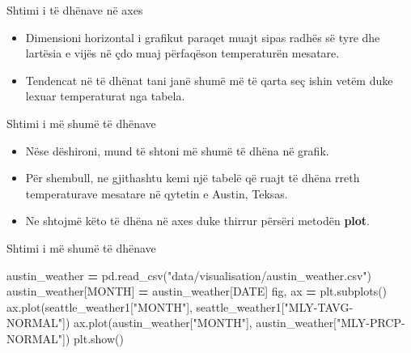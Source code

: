 \documentclass[
  ignorenonframetext,
]{beamer}
\newenvironment{Shaded}{\begin{snugshade}}{\end{snugshade}}
\newcommand{\NormalTok}[1]{#1}
\newcommand{\OperatorTok}[1]{\textcolor[rgb]{0.81,0.36,0.00}{\textbf{#1}}}
\newcommand{\StringTok}[1]{\textcolor[rgb]{0.31,0.60,0.02}{#1}}
\begin{document}
\begin{frame}{Shtimi i të dhënave në axes}
\protect\hypertarget{shtimi-i-tuxeb-dhuxebnave-nuxeb-axes-5}{}
\begin{itemize}
\item
  Dimensioni horizontal i grafikut paraqet muajt sipas radhës së tyre
  dhe lartësia e vijës në çdo muaj përfaqëson temperaturën mesatare.
\item
  Tendencat në të dhënat tani janë shumë më të qarta seç ishin vetëm
  duke lexuar temperaturat nga tabela.
\end{itemize}
\end{frame}

\begin{frame}{Shtimi i më shumë të dhënave}
\protect\hypertarget{shtimi-i-muxeb-shumuxeb-tuxeb-dhuxebnave}{}
\begin{itemize}
\item
  Nëse dëshironi, mund të shtoni më shumë të dhëna në grafik.
\item
  Për shembull, ne gjithashtu kemi një tabelë që ruajt të dhëna rreth
  temperaturave mesatare në qytetin e Austin, Teksas.
\item
  Ne shtojmë këto të dhëna në axes duke thirrur përsëri metodën
  \textbf{plot}.
\end{itemize}
\end{frame}

\begin{frame}[fragile]{Shtimi i më shumë të dhënave}
\protect\hypertarget{shtimi-i-muxeb-shumuxeb-tuxeb-dhuxebnave-1}{}

\begin{Shaded}
\begin{Highlighting}[]
\NormalTok{austin\_weather }\OperatorTok{=}\NormalTok{ pd.read\_csv(}\StringTok{"data/visualisation/austin\_weather.csv"}\NormalTok{)}
\NormalTok{austin\_weather[}\StringTok{\textquotesingle{}MONTH\textquotesingle{}}\NormalTok{] }\OperatorTok{=}\NormalTok{ austin\_weather[}\StringTok{\textquotesingle{}DATE\textquotesingle{}}\NormalTok{]}
\NormalTok{fig, ax }\OperatorTok{=}\NormalTok{ plt.subplots()}
\NormalTok{ax.plot(seattle\_weather1[}\StringTok{"MONTH"}\NormalTok{], seattle\_weather1[}\StringTok{"MLY{-}TAVG{-}NORMAL"}\NormalTok{])}
\NormalTok{ax.plot(austin\_weather[}\StringTok{"MONTH"}\NormalTok{], austin\_weather[}\StringTok{"MLY{-}PRCP{-}NORMAL"}\NormalTok{])}
\NormalTok{plt.show()}
\end{Highlighting}
\end{Shaded}
\end{frame}
\end{document}
